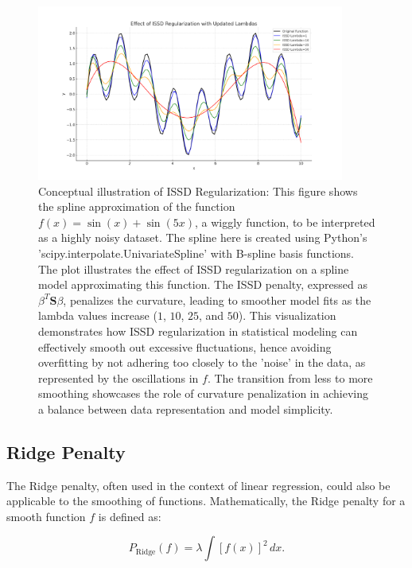 \documentclass[12pt, twoside,hidelinks]{article}
\theoremstyle{definition}
\numberwithin{equation}{section}
\begin{document}
\begin{figure}[H]
\centering
\includegraphics[width=0.9\textwidth]{visuals/Theory/issd_regularization_updated_lambdas.png}
\caption[Conceptual illustration of ISSD Regularization]{Conceptual illustration of ISSD Regularization: This figure shows the spline approximation of the function \(f(x) = \sin(x) + \sin(5x)\), a wiggly function, to be interpreted as a highly noisy dataset. The spline here is created using Python's 'scipy.interpolate.UnivariateSpline' with B-spline basis functions. The plot illustrates the effect of ISSD regularization on a spline model approximating this function. The ISSD penalty, expressed as \( \beta^T \mathbf{S} \beta \), penalizes the curvature, leading to smoother model fits as the lambda values increase (\(1\), \(10\), \(25\), and \(50\)). This visualization demonstrates how ISSD regularization in statistical modeling can effectively smooth out excessive fluctuations, hence avoiding overfitting by not adhering too closely to the 'noise' in the data, as represented by the oscillations in \(f\). The transition from less to more smoothing showcases the role of curvature penalization in achieving a balance between data representation and model simplicity.}
\label{fig:issd_effect_adjusted}
\end{figure}


\subsection{Ridge Penalty}\label{sec:smooth:ridge}

The Ridge penalty, often used in the context of linear regression, could also be applicable to the smoothing of functions. Mathematically, the Ridge penalty for a smooth function \( f \) is defined as:

\begin{equation}
    P_{\text{Ridge}}(f) = \lambda \int [f(x)]^2 \, dx.
    \label{eq:Ridge_penalty}
\end{equation}
\end{document}
